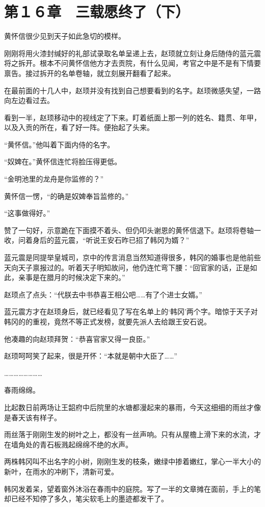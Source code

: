 \section{第１６章　三载愿终了（下）}

黄怀信很少见到天子如此急切的模样。

刚刚将用火漆封缄好的礼部试录取名单呈递上去，赵顼就立刻让身后随侍的蓝元震将之拆开。根本不问黄怀信他方才去贡院，有什么见闻，考官之中是不是有下情要禀告。接过拆开的名单卷轴，就立刻展开翻看了起来。

在最前面的十几人中，赵顼并没有找到自己想要看到的名字。赵顼微感失望，一路向左边看过去。

看到一半，赵顼移动中的视线定了下来。盯着纸面上那一列的姓名、籍贯、年甲，以及入贡的所在，看了好一阵。便抬起了头来。

“黄怀信。”他叫着下面内侍的名字。

“奴婢在。”黄怀信连忙将脸压得更低。

“金明池里的龙舟是你监修的？”

黄怀信一愣，“的确是奴婢奉旨监修的。”

“这事做得好。”

赞了一句好，示意跪在下面摸不着头、但仍叩头谢恩的黄怀信退下。赵顼将卷轴一收，问着身后的蓝元震，“听说王安石昨已招了韩冈为婿？”

蓝元震是同提举皇城司，京中的传言消息当然知道得很多，韩冈的婚事也是他前些天向天子禀报过的。听着天子明知故问，他仍连忙弯下腰：“回官家的话，正是如此，亲事是在腊月的时候决定下来的。”

赵顼点了点头：“代朕去中书恭喜王相公吧……有了个进士女婿。”

蓝元震方才在赵顼身后，就已经看见了写在名单上的‘韩冈’两个字。暗惊于天子对韩冈的的重视，竟然不等正式发榜，就要先派人去给跟王安石说。

他凑趣的向赵顼拜贺：“恭喜官家又得一良臣。”

赵顼呵呵笑了起来，很是开怀：“本就是朝中大臣了……”

……………………

春雨绵绵。

比起数日前两场让王韶府中后院里的水塘都漫起来的暴雨，今天这细细的雨丝才像是春天该有样子。

雨丝落于刚刚生发的树叶之上，都没有一丝声响。只有从屋檐上滑下来的水流，才在墙角处的青石板溅起绵绵不绝的水声。

两株韩冈叫不出名字的小树，刚刚生发的枝条，嫩绿中掺着嫩红，掌心一半大小的新叶，在雨水的冲刷下，清新可爱。

韩冈发着呆，望着窗外沐浴在春雨中的庭院。写了一半的文章摊在面前，手上的笔却已经不知停了多久，笔尖软毛上的墨迹都发干了。

